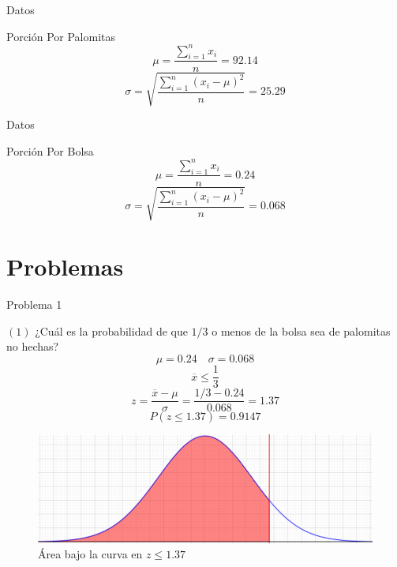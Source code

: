 \documentclass[11pt]{beamer}
\begin{document}
		\begin{frame}{Datos}
			\begin{block}{Porción Por Palomitas}
				$$ \mu = \frac{\displaystyle\sum_{i=1}^{n} x_i}{n} = 92.14 $$
				$$ \sigma = \sqrt{\frac{\displaystyle\sum_{i=1}^{n} (x_i-\mu)^2}{n}} = 25.29 $$
			\end{block}
		\end{frame}

		\begin{frame}{Datos}
			\begin{block}{Porción Por Bolsa}
				$$ \mu = \frac{\displaystyle\sum_{i=1}^{n} x_i}{n} = 0.24 $$
				$$ \sigma = \sqrt{\frac{\displaystyle\sum_{i=1}^{n} (x_i-\mu)^2}{n}} = 0.068 $$
			\end{block}
		\end{frame}


	\section{Problemas}
		\begin{frame}{Problema 1}
			\begin{block}{$ \left( 1 \right) $ ¿Cuál es la probabilidad de que $ 1/3 $ o menos de la bolsa sea de palomitas no hechas?}
				$$ \mu = 0.24 \quad \sigma = 0.068 $$
				$$ \overline{x} \leq \frac{1}{3} $$
				$$ z = \frac{\overline{x} - \mu}{\sigma} = \frac{1/3 - 0.24}{0.068} = 1.37 $$
				$$ P(z \leq 1.37) = 0.9147 $$
			\end{block}
		\end{frame}

		\begin{frame}
			\begin{figure}[H]
				\centering
				\includegraphics[width=\linewidth]{Imagen1.png}
				\caption{Área bajo la curva en $ z \leq 1.37 $}
			\end{figure}
		\end{frame}
\end{document}
